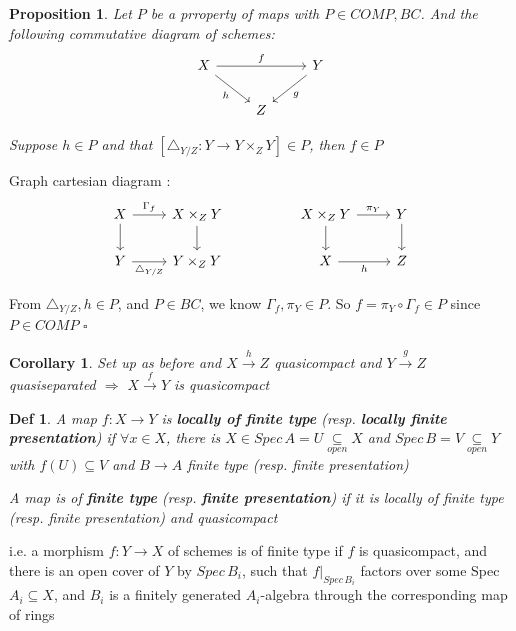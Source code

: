 \documentclass{article}
\newtheorem{definition}[theorem]{Def}
\newtheorem{corollary}[theorem]{Corollary}
\newtheorem{proposition}[theorem]{Proposition}
\newenvironment{Proof}{{\noindent \indent \it Proof:\quad}}{\hfill $\square$\par}
\begin{document}
\begin{proposition}
Let $P$ be a prroperty of maps with $P\in COMP, BC$. And the following commutative diagram of schemes:
    \[\begin{tikzcd}
	X && Y \\
	& Z
	\arrow["h"', from=1-1, to=2-2]
	\arrow["g", from=1-3, to=2-2]
	\arrow["f", from=1-1, to=1-3]
\end{tikzcd}\]

Suppose $h\in P$ and that $[\triangle_{Y/Z}:Y\to Y\times_Z Y]\in P$, then $f\in P$
\end{proposition}
\begin{Proof}
    Graph cartesian diagram :
\[\begin{tikzcd}
	X & {X\times_ZY} && {X\times_ZY} & Y \\
	Y & {Y\times_ZY} && X & Z
	\arrow[from=1-1, to=2-1]
	\arrow["{\triangle_{Y/Z}}"', from=2-1, to=2-2]
	\arrow[from=1-2, to=2-2]
	\arrow["{\Gamma_f}", from=1-1, to=1-2]
	\arrow["{\pi_Y}", from=1-4, to=1-5]
	\arrow[from=1-4, to=2-4]
	\arrow["{h}"', from=2-4, to=2-5]
	\arrow[from=1-5, to=2-5]
\end{tikzcd}\]

From $\triangle_{Y/Z},h\in P$, and $P\in BC$, we know $\Gamma_f,\pi_Y\in P$. So $f=\pi_Y\circ \Gamma_f\in P$ since $P\in COMP$
\end{Proof}

\begin{corollary}
    Set up as before and $X \xrightarrow{h} Z$ quasicompact and $Y \xrightarrow{g} Z$ quasiseparated $\Rightarrow$ $X\xrightarrow{f} Y$ is quasicompact
\end{corollary}

\begin{definition}
    A map $f:X\to Y$ is \textbf{locally of finite type} (resp. \textbf{locally finite presentation}) if $\forall x\in X$, there is $X\in Spec\,A=U\mathop{\subseteq}\limits_{open} X $ and $Spec\,B=V\mathop{\subseteq}\limits_{open} Y$ with $f(U)\subseteq V$ and $B\to A$ finite type (resp. finite presentation)

    A map is of \textbf{finite type} (resp. \textbf{finite presentation})
    if it is locally of finite type (resp. finite presentation) and quasicompact
\end{definition}

i.e. a morphism $f : Y \to X$ of schemes is of finite type if $f$ is quasicompact, and
there is an open cover of $Y$ by $Spec\, B_i$, such that $f|_{Spec\,B_i}$
factors over some Spec $A_i \subseteq X$, and $B_i$ is a
finitely generated $A_i$-algebra through the corresponding map of rings
\end{document}
